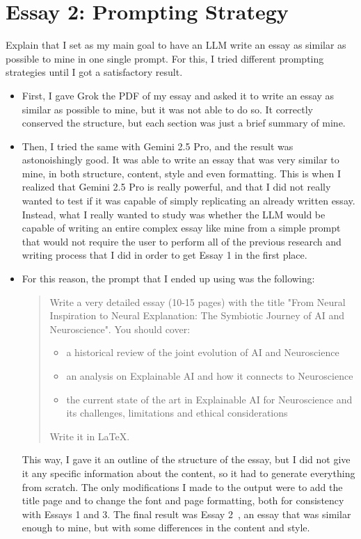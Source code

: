 \documentclass[11pt,a4paper]{article}
\begin{document}
\section{Essay 2: Prompting Strategy}

Explain that I set as my main goal to have an LLM write an essay as similar as possible to mine in one single prompt. For this, I tried different prompting strategies until I got a satisfactory result.

\begin{itemize}
    \item First, I gave Grok the PDF of my essay and asked it to write an essay as similar as possible to mine, but it was not able to do so. It correctly conserved the structure, but each section was just a brief summary of mine.
    \item Then, I tried the same with Gemini 2.5 Pro, and the result was astonoishingly good. It was able to write an essay that was very similar to mine, in both structure, content, style and even formatting. This is when I realized that Gemini 2.5 Pro is really powerful, and that I did not really wanted to test if it was capable of simply replicating an already written essay. Instead, what I really wanted to study was whether the LLM would be capable of writing an entire complex essay like mine from a simple prompt that would not require the user to perform all of the previous research and writing process that I did in order to get Essay 1 in the first place.
    \item For this reason, the prompt that I ended up using was the following:
    \begin{quote}
        Write a very detailed essay (10-15 pages) with the title "From Neural Inspiration to Neural Explanation: The Symbiotic Journey of AI and Neuroscience". You should cover:
        \begin{itemize}
            \item a historical review of the joint evolution of AI and Neuroscience
            \item an analysis on Explainable AI and how it connects to Neuroscience
            \item the current state of the art in Explainable AI for Neuroscience and its challenges, limitations and ethical considerations
        \end{itemize}
        Write it in LaTeX.
    \end{quote}
    This way, I gave it an outline of the structure of the essay, but I did not give it any specific information about the content, so it had to generate everything from scratch. The only modifications I made to the output were to add the title page and to change the font and page formatting, both for consistency with Essays 1 and 3. The final result was Essay 2~\cite{essay2}, an essay that was similar enough to mine, but with some differences in the content and style.
\end{itemize}
\end{document}
